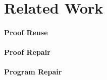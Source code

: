 \section{Related Work}

\paragraph{Proof Reuse}

\paragraph{Proof Repair}

\paragraph{Program Repair}
